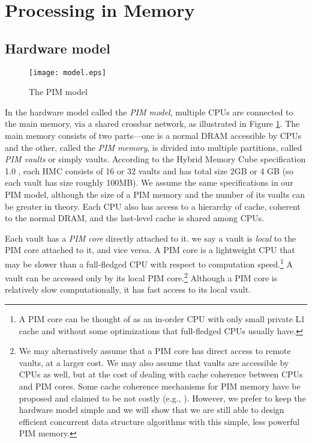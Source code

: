 \section{Processing in Memory}
\label{section:model}

\subsection{Hardware model}
\label{section:hardware_model}

\begin{figure}[ht!]
\centering
\texttt{[image: model.eps]}
\caption{The PIM model}
\label{figure:model}
\end{figure}

In the hardware model called the \emph{PIM model}, multiple CPUs are connected to the main
memory, via a shared crossbar network, as illustrated in Figure \ref{figure:model}.
The main memory consists of two parts---one is a normal DRAM accessible by CPUs 
and the other, called the \emph{PIM memory}, is divided into multiple partitions, 
called \emph{PIM vaults} or simply vaults.  
According to the Hybrid Memory Cube specification 1.0 \cite{website:HMC}, each HMC consists of 16 or 
32 vaults and has total size 2GB or 4 GB (so each vault has size roughly 100MB). 
We assume the same specifications in our PIM model, although the size of a PIM memory and 
the number of its vaults can be greater in theory. 
Each CPU also has access to a hierarchy of cache, coherent to the normal DRAM, 
and the last-level cache is shared among CPUs. 

Each vault has a \emph{PIM core} directly attached to it.
we say a vault is \emph{local} to the PIM core attached to it, and vice versa.
A PIM core is a lightweight CPU that may be slower than a full-fledged CPU
with respect to computation speed.\footnote{
A PIM core can be thought of as an in-order CPU with only small private L1 cache and 
without some optimizations that full-fledged CPUs usually have.}
A vault can be accessed only by its local PIM core.\footnote{
We may alternatively assume that a PIM core has direct access to remote vaults, at a larger cost. 
We may also assume that vaults are accessible by CPUs as well, 
but at the cost of dealing with cache coherence between CPUs and PIM cores. 
Some cache coherence mechanisms for PIM memory have be proposed 
and claimed to be not costly (e.g., \cite{boroumand2016}). 
However, we prefer to keep the hardware model simple and we will show that we are still able to 
design efficient concurrent data structure algorithms with this simple, less powerful PIM memory.}
Although a PIM core is relatively slow computationally, it has fast access to its local vault.

